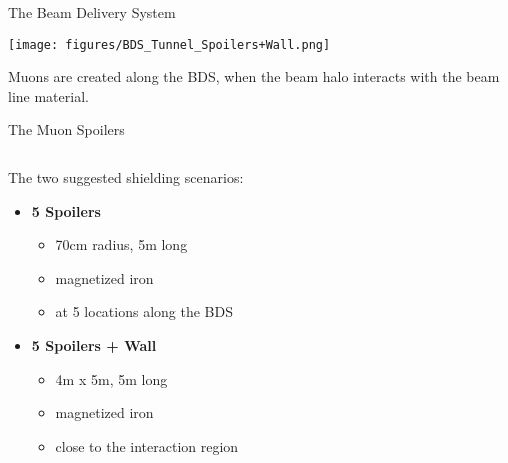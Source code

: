 \documentclass[xcolor={dvipsnames}]{beamer}
\begin{document}
  \begin{frame}{The Beam Delivery System}
\begin{center}
  \texttt{[image: figures/BDS\_Tunnel\_Spoilers+Wall.png]}
\end{center}
Muons are created along the BDS, when the beam halo interacts with the beam line material.
\end{frame}

\begin{frame}{The Muon Spoilers}
\begin{columns}
 \begin{column}{0.4\textwidth}
 The two suggested shielding scenarios:
  \begin{itemize}
   \item \textbf{5 Spoilers}
   \begin{itemize}
    \item 70cm radius, 5m long
    \item magnetized iron
    \item at 5 locations along the BDS
   \end{itemize}
   \item \textbf{5 Spoilers + Wall}
    \begin{itemize}
    \item 4m x 5m, 5m long
    \item magnetized iron
    \item close to the interaction region
   \end{itemize}
  \end{itemize}

 \end{column}
 \begin{column}{0.6\textwidth}
  \\\vspace*{0.3cm}
 \end{column}
\end{columns} 
\end{frame}
\end{document}
